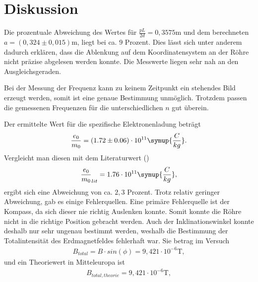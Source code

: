 \section{Diskussion}
\label{sec:Diskussion}

Die prozentuale Abweichung des Wertes für $\frac{pL}{2d} = 0,3575 \si{\meter} $ und dem berechneten $a = (0,324 \pm 0,015)  \si{\meter}$, liegt bei ca. $9$ Prozent.
Dies lässt sich unter anderem dadurch erklären, dass die Ablenkung auf dem Koordinatensystem an der Röhre nicht präzise abgelesen werden konnte.
Die Messwerte liegen sehr nah an den Ausgleichsgeraden.

\noindent Bei der Messung der Frequenz kann zu keinem Zeitpunkt ein stehendes Bild erzeugt werden, somit ist eine genaue Bestimmung unmöglich. 
Trotzdem passen die gemessenen Frequenzen für die unterschiedlichen $n$ gut überein.

\noindent 
Der ermittelte Wert für die spezifische Elektronenladung beträgt 
\begin{align*}
\frac{e_0}{m_0} = (1.72 \pm 0.06) \cdot 10^{11} \symup{\frac{C}{kg}} .
\end{align*}
Vergleicht man diesen mit dem Literaturwert (\cite{kent3})
\begin{align*}
\frac{e_0}{m_0}_{lit} = 1.76 \cdot 10^{11} \symup{\frac{C}{kg}},
\end{align*}
ergibt sich eine Abweichung von ca. $2,3$ Prozent. Trotz relativ geringer Abweichung, gab es einige Fehlerquellen.
Eine primäre Fehlerquelle ist der Kompass, da sich dieser nie richtig Auslenken konnte.
Somit konnte die Röhre nicht in die richtige Position gebracht werden. 
Auch der Inklinationswinkel konnte deshalb nur sehr ungenau bestimmt werden, weshalb die Bestimmung der Totalintensität des Erdmagnetfeldes fehlerhaft war.
Sie betrag im Versuch 
\begin{align*}
B_{total} = B \cdot sin(\phi) = 9,421 \cdot 10^{-6} \si{\tesla},
\end{align*}
und ein Theoriewert in Mitteleuropa ist
\begin{align*}
B_{total,theorie} =  9,421 \cdot 10^{-6} \si{\tesla},
\end{align*}
